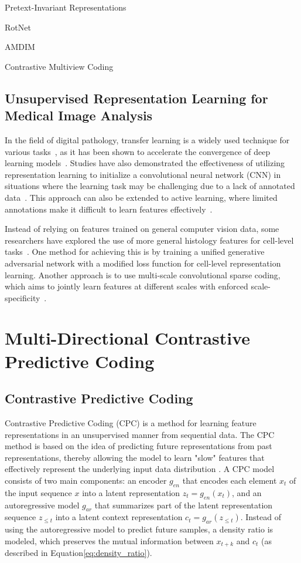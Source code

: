 Pretext-Invariant Representations

RotNet

AMDIM

Contrastive Multiview Coding

\subsection{Unsupervised Representation Learning for Medical Image Analysis}
\label{subsec:unsupervise_representation_for_medical}
In the field of digital pathology, transfer learning is a widely used technique for various tasks~\citep{srinidhi2020deep}, as it has been shown to accelerate the convergence of deep learning models~\citep{bayramoglu2016transfer}. Studies have also demonstrated the effectiveness of utilizing representation learning to initialize a convolutional neural network (CNN) in situations where the learning task may be challenging due to a lack of annotated data~\citep{hou2016automatic}. This approach can also be extended to active learning, where limited annotations make it difficult to learn features effectively~\cite{carse2019active}.

Instead of relying on features trained on general computer vision data, some researchers have explored the use of more general histology features for cell-level tasks~\citep{hu2018unsupervised}. One method for achieving this is by training a unified generative adversarial network with a modified loss function for cell-level representation learning. Another approach is to use multi-scale convolutional sparse coding, which aims to jointly learn features at different scales with enforced scale-specificity~\citep{chang2017unsupervised}.



\section{Multi-Directional Contrastive Predictive Coding}
\label{sec:unsupervised_multi_directional_cpc}
\subsection{Contrastive Predictive Coding}
\label{subsec:unsupervised_cpc}
Contrastive Predictive Coding (CPC) is a method for learning feature representations in an unsupervised manner from sequential data. The CPC method is based on the idea of predicting future representations from past representations, thereby allowing the model to learn "slow" features that effectively represent the underlying input data distribution \citep{henaff2019data,oord2018representation}. A CPC model consists of two main components: an encoder $g_{en}$ that encodes each element $x_t$ of the input sequence $x$ into a latent representation $z_t = g_{en}(x_t)$, and an autoregressive model $g_{ar}$ that summarizes part of the latent representation sequence $z_{\le t}$ into a latent context representation $c_t = g_{ar}(z_{\le t})$. Instead of using the autoregressive model to predict future samples, a density ratio is modeled, which preserves the mutual information between $x_{t+k}$ and $c_t$ (as described in Equation\ref{eq:density_ratio}).

